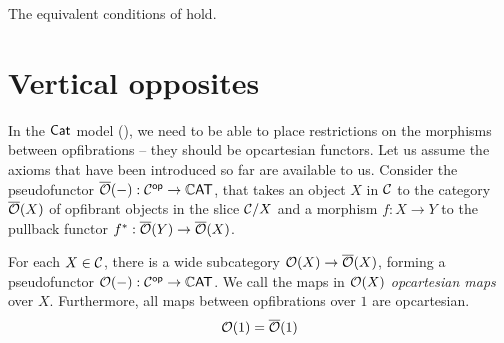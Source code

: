 \begin{axiom}\label{ax:exponentiability}
  The equivalent conditions of  hold.
\end{axiom}


\section*{Vertical opposites}

In the $\mathsf{Cat}$ model (), we need to be able to place restrictions
on the morphisms between opfibrations -- they should be
opcartesian functors.
Let us assume the axioms that have been introduced so far are available to us.
Consider the pseudofunctor ${\overline{{\mathcal{O}}}}(-) : \mathcal{C}^{\mathsf{op}} \to \mathbb{C}\mathsf{AT}$,
that takes an object $X$ in $\mathcal{C}$ to the category ${\overline{{\mathcal{O}}}}(X)$
of opfibrant objects in the slice $\mathcal{C} / X$
and a morphism $f : X \to Y$ to the pullback functor
$f^* : {\overline{{\mathcal{O}}}}(Y) \to {\overline{{\mathcal{O}}}}(X)$.

\begin{axiom}\label{ax:opcartesian-map}
  For each $X \in \mathcal{C}$,
  there is a wide subcategory ${\mathcal{O}}(X) \to {\overline{{\mathcal{O}}}}(X)$,
  forming a pseudofunctor ${\mathcal{O}}(-) : \mathcal{C}^{\mathsf{op}} \to \mathbb{C}\mathsf{AT}$.
  We call the maps in ${\mathcal{O}}(X)$ \emph{opcartesian maps} over $X$.
  Furthermore, all maps between opfibrations over $1$ are opcartesian.
  \[{\mathcal{O}}(1) = {\overline{{\mathcal{O}}}}(1)\]
\end{axiom}

